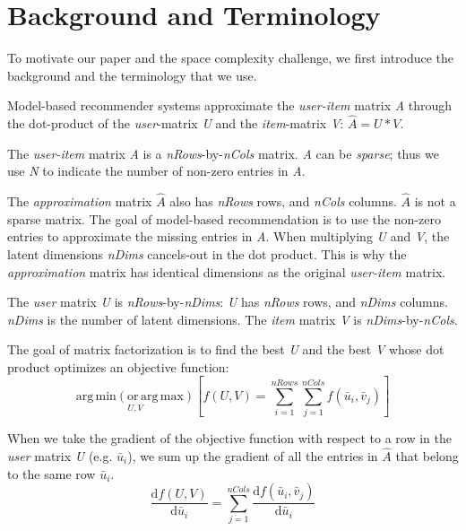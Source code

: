 \section{Background and Terminology}
To motivate our paper and the space complexity challenge, we first introduce the background and the terminology that we use.  


Model-based recommender systems approximate the \emph{user-item} matrix \emph{A} through 
the dot-product of the \emph{user}-matrix \emph{U} and the \emph{item}-matrix \emph{V}: $\hat{A} = U * V.$  

The \emph{user-item} matrix \emph{A} is a \emph{nRows}-by-\emph{nCols} matrix.
\emph{A} can be \emph{sparse}; thus we use \emph{N} to indicate the number of non-zero entries in \emph{A}.

The \emph{approximation} matrix $\hat{A}$ also has \emph{nRows} rows, and \emph{nCols} columns.  
$\hat{A}$ is not a sparse matrix.  The goal of model-based recommendation is to use the non-zero entries to approximate the missing entries in \emph{A}. 
When multiplying \emph{U} and \emph{V}, the latent dimensions \emph{nDims} cancels-out in the dot product. 
This is why the \emph{approximation} matrix has identical dimensions as the original \emph{user-item} matrix.  

The \emph{user} matrix \emph{U} is \emph{nRows}-by-\emph{nDims}: \emph{U} has \emph{nRows} rows, and \emph{nDims} columns.  
\emph{nDims} is the number of latent dimensions.  
The \emph{item} matrix \emph{V} is \emph{nDims}-by-\emph{nCols}.  


The goal of matrix factorization is to find the best \emph{U} and the best \emph{V} whose dot product optimizes an objective function:
\begin{equation} \label{eq:argmin}
\operatorname*{arg\,min (or\,arg\,max)}_{U,V} \left[ f(U, V) = \sum_{i=1}^{nRows} \sum_{j=1}^{nCols} f(\bar{u}_{i}, \bar{v}_{j}) \right]
\end{equation}

When we take the gradient of the objective function with respect to a row in the \emph{user} matrix \emph{U} (e.g. $\bar{u}_{i}$), we sum up the gradient of all the entries in $\hat{A}$ that belong to the same row $\bar{u}_{i}$.  
\begin{equation} \label{eq:gradU}
\frac{\text{d}f(U,V)}{\text{d}\bar{u}_i} = \sum_{j=1}^{nCols} \frac{\text{d}f(\bar{u}_i,\bar{v}_j)}{\text{d}\bar{u}_i}
\end{equation}

